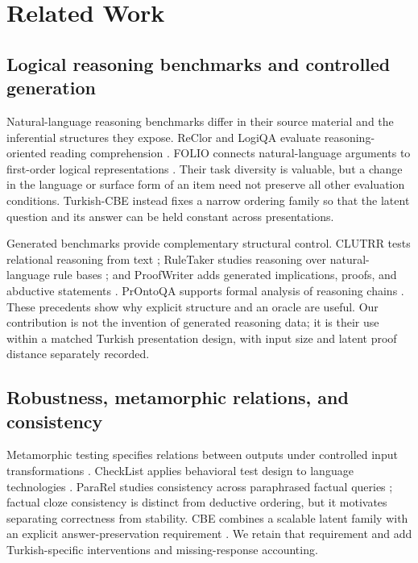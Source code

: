 \section{Related Work}

\subsection{Logical reasoning benchmarks and controlled generation}

Natural-language reasoning benchmarks differ in their source material and the inferential structures they
expose. ReClor and LogiQA evaluate reasoning-oriented reading comprehension \citep{yu2020reclor,
liu2020logiqa}. FOLIO connects natural-language arguments to first-order logical representations
\citep{han2024folio}. Their task diversity is valuable, but a change in the language or surface form of an
item need not preserve all other evaluation conditions. Turkish-CBE instead fixes a narrow ordering family
so that the latent question and its answer can be held constant across presentations.

Generated benchmarks provide complementary structural control. CLUTRR tests relational reasoning from text
\citep{sinha2019clutrr}; RuleTaker studies reasoning over natural-language rule bases
\citep{clark2020ruletaker}; and ProofWriter adds generated implications, proofs, and abductive statements
\citep{tafjord2021proofwriter}. PrOntoQA supports formal analysis of reasoning chains
\citep{saparov2023prontoqa}. These precedents show why explicit structure and an oracle are useful. Our
contribution is not the invention of generated reasoning data; it is their use within a matched Turkish
presentation design, with input size and latent proof distance separately recorded.

\subsection{Robustness, metamorphic relations, and consistency}

Metamorphic testing specifies relations between outputs under controlled input transformations
\citep{segura2016metamorphic}. CheckList applies behavioral test design to language technologies
\citep{ribeiro2020checklist}. ParaRel studies consistency across paraphrased factual queries
\citep{elazar2021pararel}; factual cloze consistency is distinct from deductive ordering, but it motivates
separating correctness from stability. CBE combines a scalable latent family with an explicit
answer-preservation requirement \citep{jiang2026cbe}. We retain that requirement and add Turkish-specific
interventions and missing-response accounting.

